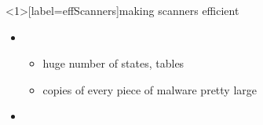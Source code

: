 \usetikzlibrary{matrix,shapes.misc}

\begin{frame}<1>[label=effScanners]{making scanners efficient}
    \begin{itemize}
    \item {}
        \begin{itemize}
        \item huge number of states, tables
        \item copies of every piece of malware pretty large
        \end{itemize}
    \item {}
    \end{itemize}
\end{frame}

